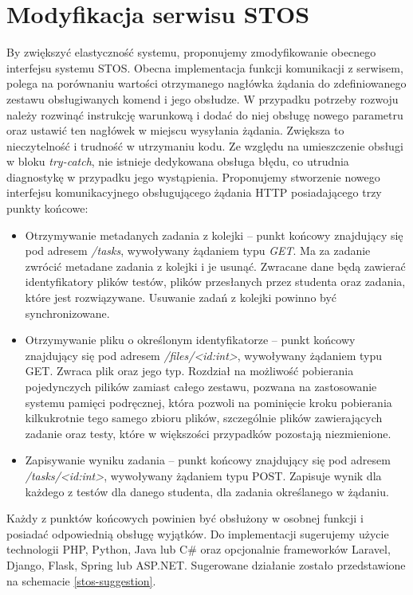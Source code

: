 \section{Modyfikacja serwisu STOS}
By zwiększyć elastyczność systemu, proponujemy zmodyfikowanie obecnego interfejsu systemu STOS. Obecna implementacja funkcji komunikacji z serwisem, polega na porównaniu wartości otrzymanego nagłówka żądania do zdefiniowanego zestawu obsługiwanych komend i jego obsłudze. W przypadku potrzeby rozwoju należy rozwinąć instrukcję warunkową i dodać do niej obsługę nowego parametru oraz ustawić ten nagłówek w miejscu wysyłania żądania. Zwiększa to nieczytelność i trudność w utrzymaniu kodu. Ze względu na umieszczenie obsługi w bloku \textit{try-catch}, nie istnieje dedykowana obsługa błędu, co utrudnia diagnostykę w przypadku jego wystąpienia. Proponujemy stworzenie nowego interfejsu komunikacyjnego obsługującego żądania HTTP posiadającego trzy punkty końcowe:
\begin{itemize}
    \item Otrzymywanie metadanych zadania z kolejki -- punkt końcowy znajdujący się pod adresem \textit{/tasks}, wywoływany żądaniem typu \textit{GET}. Ma za zadanie zwrócić metadane zadania z kolejki i je usunąć. Zwracane dane będą zawierać identyfikatory plików testów, plików przesłanych przez studenta oraz zadania, które jest rozwiązywane. Usuwanie zadań z kolejki powinno być synchronizowane.
    \item Otrzymywanie pliku o określonym identyfikatorze -- punkt końcowy znajdujący się pod adresem \textit{/files/<id:int>}, wywoływany żądaniem typu GET. Zwraca plik oraz jego typ. Rozdział na możliwość pobierania pojedynczych pilików zamiast całego zestawu, pozwana na zastosowanie systemu pamięci podręcznej, która pozwoli na pominięcie kroku pobierania kilkukrotnie tego samego zbioru plików, szczególnie plików zawierających zadanie oraz testy, które w większości przypadków pozostają niezmienione.
    \item Zapisywanie wyniku zadania -- punkt końcowy znajdujący się pod adresem \textit{/tasks/<id:int>}, wywoływany żądaniem typu POST. Zapisuje wynik dla każdego z testów dla danego studenta, dla zadania określanego w żądaniu.
\end{itemize}
\newline \indent Każdy z punktów końcowych powinien być obsłużony w osobnej funkcji i posiadać odpowiednią obsługę wyjątków. Do implementacji sugerujemy użycie technologii PHP, Python, Java lub C# oraz opcjonalnie frameworków Laravel, Django, Flask, Spring lub ASP.NET. Sugerowane działanie zostało przedstawione na schemacie \ref{stos-suggestion}.
